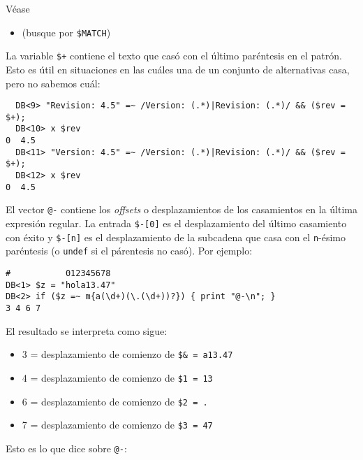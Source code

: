 Véase 
\begin{itemize}
\item
{} (busque por \verb|$MATCH|)
\end{itemize}



La variable \verb|$+| contiene el texto que casó
con el último paréntesis en el patrón. Esto es útil
en situaciones en las cuáles una de un conjunto de alternativas 
casa, pero no sabemos cuál:

\begin{verbatim}
  DB<9> "Revision: 4.5" =~ /Version: (.*)|Revision: (.*)/ && ($rev = $+);
  DB<10> x $rev
0  4.5
  DB<11> "Version: 4.5" =~ /Version: (.*)|Revision: (.*)/ && ($rev = $+);
  DB<12> x $rev
0  4.5
\end{verbatim}

\label{parrafo:iniciocas}

El vector \verb|@-| contiene los \emph{offsets} o desplazamientos
de los casamientos en la última expresión regular.
La entrada \verb|$-[0]| es el desplazamiento del último casamiento con éxito
y \verb|$-[n]| es el desplazamiento de la subcadena que casa
con el \verb|n|-ésimo paréntesis (o \verb|undef| si el párentesis
no casó). Por ejemplo:

\begin{verbatim}
#           012345678
DB<1> $z = "hola13.47"
DB<2> if ($z =~ m{a(\d+)(\.(\d+))?}) { print "@-\n"; }
3 4 6 7
\end{verbatim}
El resultado se interpreta como sigue:
\begin{itemize}
\item 3 = desplazamiento de comienzo de \verb|$& = a13.47| 
\item 4 = desplazamiento de comienzo de \verb|$1 = 13|
\item 6 = desplazamiento de comienzo de \verb|$2 = .|
\item 7 = desplazamiento de comienzo de \verb|$3 = 47|
\end{itemize}

Esto es lo que dice  sobre \verb|@-|:


